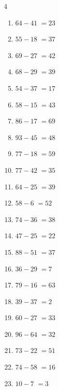 \begin{multicols}{4}
\begin{enumerate}
  \item $64-41$
        $=23$

  \item $55-18$
        $=37$

  \item $69-27$
        $=42$

  \item $68-29$
        $=39$

  \item $54-37$
        $=17$

  \item $58-15$
        $=43$

  \item $86-17$
        $=69$

  \item $93-45$
        $=48$

  \item $77-18$
        $=59$

  \item $77-42$
        $=35$

  \item $64-25$
        $=39$

  \item $58-6$
        $=52$

  \item $74-36$
        $=38$

  \item $47-25$
        $=22$

  \item $88-51$
        $=37$

  \item $36-29$
        $=7$

  \item $79-16$
        $=63$

  \item $39-37$
        $=2$

  \item $60-27$
        $=33$

  \item $96-64$
        $=32$

  \item $73-22$
        $=51$

  \item $74-58$
        $=16$

  \item $10-7$
        $=3$

\columnbreak %


\end{enumerate}
\end{multicols}
